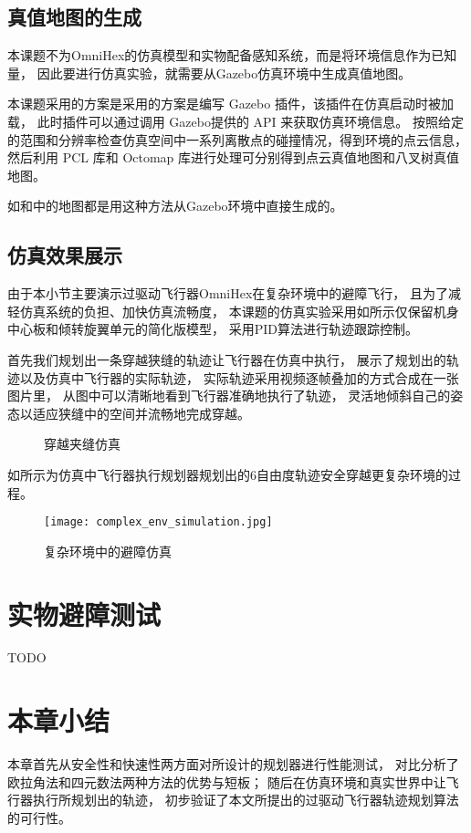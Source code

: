 \subsection{真值地图的生成}
本课题不为OmniHex的仿真模型和实物配备感知系统，而是将环境信息作为已知量，
因此要进行仿真实验，就需要从Gazebo仿真环境中生成真值地图。

本课题采用的方案是采用的方案是编写 Gazebo 插件，该插件在仿真启动时被加载，
此时插件可以通过调用 Gazebo提供的 API 来获取仿真环境信息。
按照给定的范围和分辨率检查仿真空间中一系列离散点的碰撞情况，得到环境的点云信息，
然后利用 PCL 库和 Octomap 库进行处理可分别得到点云真值地图和八叉树真值地图。

如和中的地图都是用这种方法从Gazebo环境中直接生成的。

\subsection{仿真效果展示}
由于本小节主要演示过驱动飞行器OmniHex在复杂环境中的避障飞行，
且为了减轻仿真系统的负担、加快仿真流畅度，
本课题的仿真实验采用如所示仅保留机身中心板和倾转旋翼单元的简化版模型，
采用PID算法进行轨迹跟踪控制。

首先我们规划出一条穿越狭缝的轨迹让飞行器在仿真中执行， 
展示了规划出的轨迹以及仿真中飞行器的实际轨迹，
实际轨迹采用视频逐帧叠加的方式合成在一张图片里，
从图中可以清晰地看到飞行器准确地执行了轨迹，
灵活地倾斜自己的姿态以适应狭缝中的空间并流畅地完成穿越。

\begin{figure}[!ht]
    \setlength{\subfigcapskip}{-1bp}
    \centering
    \begin{minipage}{\textwidth}
  
    \centering
    \subfigure{\label{fig:sim_narrow_gap_traj}}\addtocounter{subfigure}{-2}
    \hspace{0.2em}
    \subfigure{\label{fig:sim_narrow_gap_actual}}\addtocounter{subfigure}{-2}
    
    \end{minipage}
    \caption{穿越夹缝仿真}
    \label{fig:narrow_gap_simulation}
  \end{figure}

如所示为仿真中飞行器执行规划器规划出的6自由度轨迹安全穿越更复杂环境的过程。
\begin{figure}[ht]
    \centering
    \texttt{[image: complex\_env\_simulation.jpg]}
    \caption{复杂环境中的避障仿真}
    \label{fig:complex_env_simulation}
\end{figure}

\section{实物避障测试}\label{sec:real_world_experiments}
TODO
\section{本章小结}\label{sec:summary_5}
本章首先从安全性和快速性两方面对所设计的规划器进行性能测试，
对比分析了欧拉角法和四元数法两种方法的优势与短板；
随后在仿真环境和真实世界中让飞行器执行所规划出的轨迹，
初步验证了本文所提出的过驱动飞行器轨迹规划算法的可行性。
